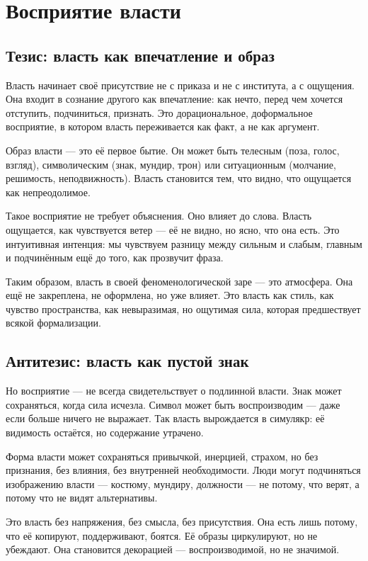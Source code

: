 \chapter{Восприятие власти}

\section{Тезис: власть как впечатление и образ}

Власть начинает своё присутствие не с приказа и не с института, а с ощущения. Она входит в сознание другого как впечатление: как нечто, перед чем хочется отступить, подчиниться, признать. Это дорациональное, доформальное восприятие, в котором власть переживается как факт, а не как аргумент.

Образ власти — это её первое бытие. Он может быть телесным (поза, голос, взгляд), символическим (знак, мундир, трон) или ситуационным (молчание, решимость, неподвижность). Власть становится тем, что видно, что ощущается как непреодолимое.

Такое восприятие не требует объяснения. Оно влияет до слова. Власть ощущается, как чувствуется ветер — её не видно, но ясно, что она есть. Это интуитивная интенция: мы чувствуем разницу между сильным и слабым, главным и подчинённым ещё до того, как прозвучит фраза.

Таким образом, власть в своей феноменологической заре — это атмосфера. Она ещё не закреплена, не оформлена, но уже влияет. Это власть как стиль, как чувство пространства, как невыразимая, но ощутимая сила, которая предшествует всякой формализации.

\section{Антитезис: власть как пустой знак}

Но восприятие — не всегда свидетельствует о подлинной власти. Знак может сохраняться, когда сила исчезла. Символ может быть воспроизводим — даже если больше ничего не выражает. Так власть вырождается в симулякр: её видимость остаётся, но содержание утрачено.

Форма власти может сохраняться привычкой, инерцией, страхом, но без признания, без влияния, без внутренней необходимости. Люди могут подчиняться изображению власти — костюму, мундиру, должности — не потому, что верят, а потому что не видят альтернативы.

Это власть без напряжения, без смысла, без присутствия. Она есть лишь потому, что её копируют, поддерживают, боятся. Её образы циркулируют, но не убеждают. Она становится декорацией — воспроизводимой, но не значимой.


